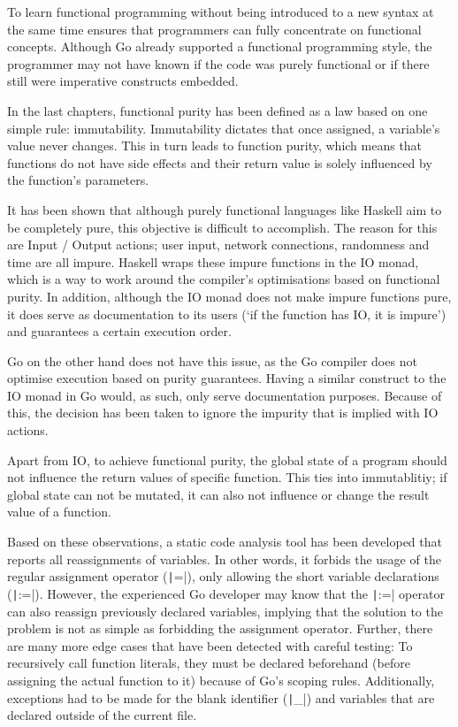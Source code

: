 
To learn functional programming without being introduced to a new syntax at the same time
ensures that programmers can fully concentrate on functional concepts. Although Go already
supported a functional programming style, the programmer may not have known if the code was
purely functional or if there still were imperative constructs embedded.

In the last chapters, functional purity has been defined as a law based on one simple rule: immutability.
Immutability dictates that once assigned, a variable's value never changes.
This in turn leads to function purity, which means that functions do not have side
effects and their return value is solely influenced by the function's parameters.

It has been shown that although purely functional languages like Haskell aim to be completely
pure, this objective is difficult to accomplish. The reason for this are Input / Output actions; user
input, network connections, randomness and time are all impure. Haskell wraps
these impure functions in the IO monad, which is a way to work around the compiler's optimisations
based on functional purity. In addition, although the IO monad does not make impure functions pure, it
does serve as documentation to its users (`if the function has IO, it is impure') and
guarantees a certain execution order.

Go on the other hand does not have this issue, as the Go compiler does not optimise execution
based on purity guarantees. Having a similar construct to the IO monad in Go would, as such,
only serve documentation purposes. Because of this, the decision has been taken to ignore
the impurity that is implied with IO actions.

Apart from IO, to achieve functional purity, the global state of a program should not influence
the return values of specific function. This ties into immutablitiy; if global state can
not be mutated, it can also not influence or change the result value of a function.

Based on these observations, a static code analysis tool has been developed that reports
all reassignments of variables. In other words, it forbids the usage of the regular
assignment operator (\texttt|=|), only allowing the short variable declarations
(\texttt|:=|). However, the experienced Go developer may know that the \texttt|:=|
operator can also reassign previously declared variables, implying that the solution to the
problem is not as simple as forbidding the assignment operator.
Further, there are many more edge cases that have been detected with careful testing:
To recursively call function literals, they must be declared beforehand (before assigning
the actual function to it) because of Go's scoping rules. Additionally, exceptions
had to be made for the blank identifier (\texttt|_|) and variables that are declared
outside of the current file.

